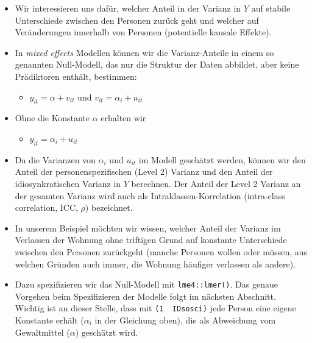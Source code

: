 \documentclass[
]{book}
\newenvironment{Shaded}{\begin{snugshade}}{\end{snugshade}}
\newcommand{\CommentTok}[1]{\textcolor[rgb]{0.56,0.35,0.01}{\textit{#1}}}
\newcommand{\DataTypeTok}[1]{\textcolor[rgb]{0.13,0.29,0.53}{#1}}
\newcommand{\DecValTok}[1]{\textcolor[rgb]{0.00,0.00,0.81}{#1}}
\newcommand{\KeywordTok}[1]{\textcolor[rgb]{0.13,0.29,0.53}{\textbf{#1}}}
\newcommand{\NormalTok}[1]{#1}
\newcommand{\OperatorTok}[1]{\textcolor[rgb]{0.81,0.36,0.00}{\textbf{#1}}}
\newcommand{\StringTok}[1]{\textcolor[rgb]{0.31,0.60,0.02}{#1}}
\providecommand{\tightlist}{%
  \setlength{\itemsep}{0pt}\setlength{\parskip}{0pt}}
\begin{document}
\begin{itemize}
\item
  Wir interessieren uns dafür, welcher Anteil in der Varianz in \(Y\) auf stabile Unterschiede zwischen den Personen zurück geht und welcher auf Veränderungen innerhalb von Personen (potentielle kausale Effekte).
\item
  In \emph{mixed effects} Modellen können wir die Varianz-Anteile in einem so genannten Null-Modell, das nur die Struktur der Daten abbildet, aber keine Prädiktoren enthält, bestimmen:

  \begin{itemize}
  \tightlist
  \item
    \(y_{it}= \alpha + v_{it}\) und \(v_{it} = \alpha_{i}+ u_{it}\)
  \end{itemize}
\item
  Ohne die Konstante \(\alpha\) erhalten wir

  \begin{itemize}
  \tightlist
  \item
    \(y_{it} = \alpha_{i}+ u_{it}\)
  \end{itemize}
\item
  Da die Varianzen von \(\alpha_i\) und \(u_{it}\) im Modell geschätzt werden, können wir den Anteil der personenspezifischen (Level 2) Varianz und den Anteil der idiosynkratischen Varianz in \(Y\) berechnen. Der Anteil der Level 2 Varianz an der gesamten Varianz wird auch als Intraklassen-Korrelation (intra-class correlation, ICC, \(\rho\)) bezeichnet.
\item
  In unserem Beispiel möchten wir wissen, welcher Anteil der Varianz im Verlassen der Wohnung ohne triftigen Grund auf konstante Unterschiede zwischen den Personen zurückgeht (manche Personen wollen oder müssen, aus welchen Gründen auch immer, die Wohnung häufiger verlassen als andere).
\item
  Dazu spezifizieren wir das Null-Modell mit \texttt{lme4::lmer()}. Das genaue Vorgehen beim Spezifizieren der Modelle folgt im nächsten Abschnitt. Wichtig ist an dieser Stelle, dass mit \texttt{(1\ \textbar{}\ IDsosci)} jede Person eine eigene Konstante erhält (\(\alpha_i\) in der Gleichung oben), die als Abweichung vom Gewaltmittel (\(\alpha\)) geschätzt wird.
\end{itemize}

\begin{Shaded}
\end{Shaded}
\end{document}
